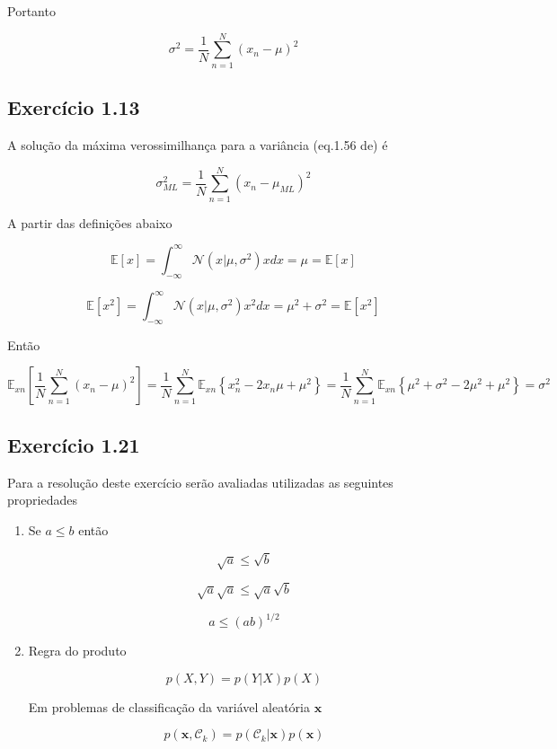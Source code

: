 \documentclass{article}
\begin{document}
     Portanto
     
     \[
     \sigma^{2} = \frac{1}{N} \sum_{n=1}^{N} (x_{n}-\mu)^{2}
     \]
     

\subsection{ Exerc\'icio 1.13}
  
  A solução da máxima verossimilhança para a variância (eq.1.56 de\cite{Bishop2006}) é
  
  \begin{equation}
    \sigma_{ML}^{2}=\frac{1}{N}\sum_{n=1}^{N}(x_{n}-\mu_{ML})^{2}      
  \end{equation}
   
   A partir das definições abaixo
   
   \begin{equation}
   	\mathbb{E}[x]=\int_{-\infty}^{\infty}\mathcal{N}(x|\mu,\sigma^{2})xdx=\mu  =\mathbb{E}[x] 
   \end{equation}
   
   
   \begin{equation}
      \mathbb{E}[x^{2}]=\int_{-\infty}^{\infty}\mathcal{N}(x|\mu,\sigma^{2})x^{2}dx=\mu^{2}+\sigma^{2} = \mathbb{E}[x^{2}] 
   \end{equation}
   
   Então
   
   \[
   \mathbb{E}_{xn}\left[\frac{1}{N}\sum_{n=1}^{N} (x_{n}-\mu)^{2}\right]=\frac{1}{N}\sum_{n=1}^{N} \mathbb{E}_{xn}\left\{x_{n}^{2}-2 x_{n} \mu + \mu^{2}  \right\}= \frac{1}{N}\sum_{n=1}^{N} \mathbb{E}_{xn}\left\{ \mu^{2}+\sigma^{2}-2 \mu^{2}+\mu^{2}  \right\} = \sigma^{2}
   \]

\subsection{ Exerc\'icio 1.21}

   Para a resolução deste exercício serão avaliadas utilizadas as seguintes propriedades
   
   
   \begin{enumerate}
   	\item  Se $ a \leq b $ então
   	 
        \[ 
         \sqrt{a}\leq\sqrt{b}   
        \]  
        
        \[
        \sqrt{a} \sqrt{a}\leq \sqrt{a} \sqrt{b}
        \]   
        
        \[
        a \leq \left( ab \right)^{1/2}
        \] 	      
   	
   	\item Regra do produto
   	
   	  \[
   	  p(X,Y)=p(Y|X)p(X)  
   	  \] 
   	   
   	   Em problemas de classificação da variável aleatória $\mathbf{x}$
   	   
   	    \[
   	   p(\mathbf{x},\mathcal{C}_{k})=p(\mathcal{C}_{k}|\mathbf{x})p(\mathbf{x})  
   	   \] 
   	     
   	
   \end{enumerate} 
  
\end{document}
